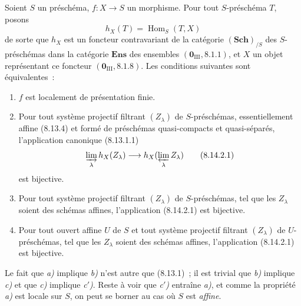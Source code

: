 \begin{proposition}[8.14.2]
\label{IV.8.14.2-fr}
Soient $S$ un préschéma, $f:X\to S$ un morphisme. Pour tout $S$-préschéma
$T$, posons
\[
h_X(T)=\operatorname{Hom}_S(T,X)
\]
de sorte que $h_X$ est un foncteur contravariant de la catégorie
$(\mathbf{Sch})_{/S}$ des $S$-préschémas dans la catégorie
$\mathbf{Ens}$ des ensembles $(\mathbf 0_{\mathrm{III}},8.1.1)$, et $X$ un
objet représentant ce foncteur $(\mathbf 0_{\mathrm{III}},8.1.8)$. Les
conditions suivantes sont équivalentes~:
\begin{enumerate}[label=\emph{\alph*)}]
  \item $f$ est localement de présentation finie.
  \item Pour tout système projectif filtrant $(Z_\lambda)$ de
  $S$-préschémas, essentiellement affine (8.13.4) et formé de préschémas
  quasi-compacts et quasi-séparés, l'application canonique (8.13.1.1)
\begin{equation}
\label{IV.8.14.2.1-fr}
\varinjlim_\lambda h_X(Z_\lambda)
\longrightarrow h_X(\varprojlim_\lambda Z_\lambda) \tag{8.14.2.1}
\end{equation}
  est bijective.
  \item Pour tout système projectif filtrant $(Z_\lambda)$ de
  $S$-préschémas, tel que les $Z_\lambda$ soient des schémas affines,
  l'application (8.14.2.1) est bijective.
  \item[\rm c$'$)] Pour tout ouvert affine $U$ de $S$ et tout système
  projectif filtrant $(Z_\lambda)$ de $U$-préschémas, tel que les $Z_\lambda$
  soient des schémas affines, l'application (8.14.2.1) est bijective.
\end{enumerate}
\end{proposition}

Le fait que \emph{a)} implique \emph{b)} n'est autre que (8.13.1)~; il est
trivial que \emph{b)} implique \emph{c)} et que \emph{c)} implique
\emph{c$'$)}. Reste à voir que \emph{c$'$)} entraîne \emph{a)}, et comme la
propriété \emph{a)} est locale sur $S$, on peut se borner au cas où $S$ est
\emph{affine}.

